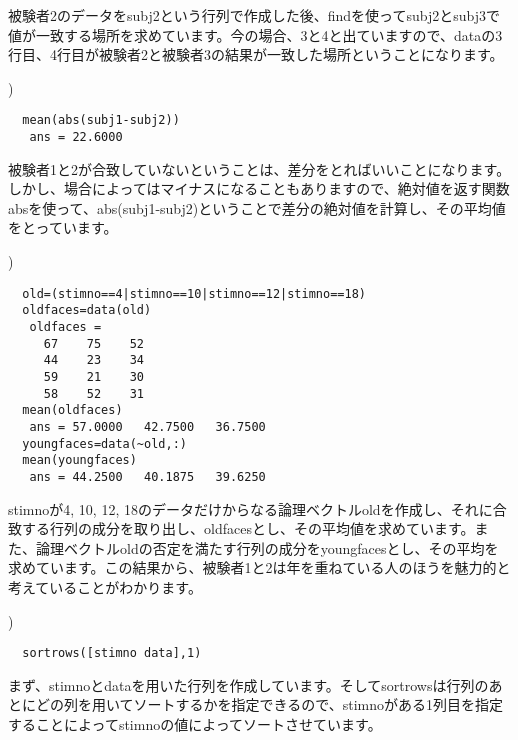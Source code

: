 \documentclass{jsarticle}
\begin{document}
\begin{screen}
被験者2のデータをsubj2という行列で作成した後、findを使ってsubj2とsubj3で値が一致する場所を求めています。今の場合、3と4と出ていますので、dataの3行目、4行目が被験者2と被験者3の結果が一致した場所ということになります。
\end{screen}

\bigskip

)
\begin{verbatim}
  mean(abs(subj1-subj2))
   ans = 22.6000
\end{verbatim}

\begin{screen}
被験者1と2が合致していないということは、差分をとればいいことになります。しかし、場合によってはマイナスになることもありますので、絶対値を返す関数absを使って、abs(subj1-subj2)ということで差分の絶対値を計算し、その平均値をとっています。
\end{screen}

\bigskip

)

\begin{verbatim}
  old=(stimno==4|stimno==10|stimno==12|stimno==18)
  oldfaces=data(old)
   oldfaces =
     67    75    52
     44    23    34
     59    21    30
     58    52    31
  mean(oldfaces)
   ans = 57.0000   42.7500   36.7500
  youngfaces=data(~old,:)
  mean(youngfaces)
   ans = 44.2500   40.1875   39.6250
\end{verbatim}

\begin{screen}
stimnoが4, 10, 12, 18のデータだけからなる論理ベクトルoldを作成し、それに合致する行列の成分を取り出し、oldfacesとし、その平均値を求めています。また、論理ベクトルoldの否定を満たす行列の成分をyoungfacesとし、その平均を求めています。この結果から、被験者1と2は年を重ねている人のほうを魅力的と考えていることがわかります。
\end{screen}

\bigskip

)

\begin{verbatim}
  sortrows([stimno data],1)
\end{verbatim}

\begin{screen}
まず、stimnoとdataを用いた行列を作成しています。そしてsortrowsは行列のあとにどの列を用いてソートするかを指定できるので、stimnoがある1列目を指定することによってstimnoの値によってソートさせています。
\end{screen}
\end{document}
